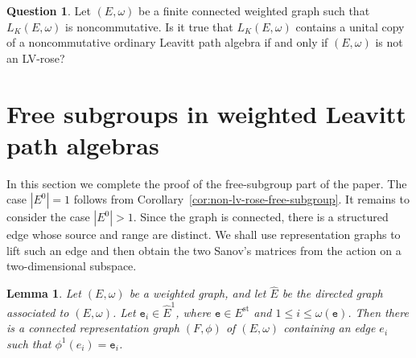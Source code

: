 \documentclass{article}
\newtheorem{lemma}{Lemma}
\theoremstyle{definition}
\newtheorem{question}{Question}
\begin{document}
\begin{question}
Let $(E,\omega)$ be a finite connected weighted graph such that $L_K(E,\omega)$ is noncommutative. Is it true that $L_K(E,\omega)$ contains a unital copy of a noncommutative ordinary Leavitt path algebra if and only if $(E,\omega)$ is not an LV-rose?
\end{question}


\section{Free subgroups in weighted Leavitt path algebras}

In this section we complete the proof of the free-subgroup part of the paper. The case $|E^0|=1$ follows from Corollary~\ref{cor:non-lv-rose-free-subgroup}. It remains to consider the case $|E^0|>1$. Since the graph is connected, there is a structured edge whose source and range are distinct. We shall use representation graphs to lift such an edge and then obtain the two Sanov's matrices from the action on a two-dimensional subspace.

\begin{lemma}\label{lem:prescribed-lift}
Let $(E,\omega)$ be a weighted graph, and let $\widehat E$ be the directed graph associated to $(E,\omega)$. Let $\mathtt{e}_i\in \widehat E^1$, where $\mathtt{e}\in E^{\mathrm{st}}$ and $1\leq i\leq \omega(\mathtt{e})$. Then there is a connected representation graph $(F,\phi)$ of $(E,\omega)$ containing an edge $e_i$ such that $\phi^1(e_i)=\mathtt{e}_i$.
\end{lemma}
\end{document}
